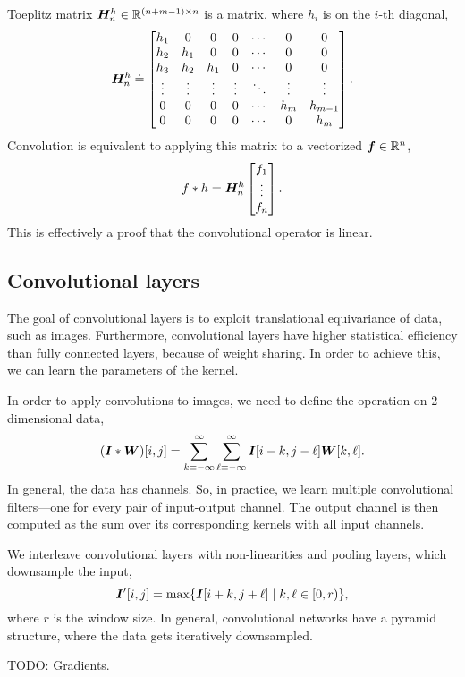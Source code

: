 Toeplitz matrix $\bm{H}_n^h \in \mathbb{R}^{(n + m - 1) \times n}$ is a matrix, where $h_i$ is on the
$i$-th diagonal, \[
    \bm{H}_n^h \doteq \begin{bmatrix}
        h_1    & 0      & 0      & 0      & \cdots & 0      & 0       \\
        h_2    & h_1    & 0      & 0      & \cdots & 0      & 0       \\
        h_3    & h_2    & h_1    & 0      & \cdots & 0      & 0       \\
        \vdots & \vdots & \vdots & \vdots & \ddots & \vdots & \vdots  \\
        0      & 0      & 0      & 0      & \cdots & h_m    & h_{m-1} \\
        0      & 0      & 0      & 0      & \cdots & 0      & h_m
    \end{bmatrix}.
\]
Convolution is equivalent to applying this matrix to a vectorized $\bm{f} \in \mathbb{R}^n$, \[
    f * h = \bm{H}_n^h \begin{bmatrix} f_1 \\ \vdots \\ f_n \end{bmatrix}.
\]
This is effectively a proof that the convolutional operator is linear.

\subsection{Convolutional layers}

The goal of convolutional layers is to exploit translational equivariance of data, such as images.
Furthermore, convolutional layers have higher statistical efficiency than fully connected layers,
because of weight sharing. In order to achieve this, we can learn the parameters of the kernel.

In order to apply convolutions to images, we need to define the operation on 2-dimensional data, \[
    (\bm{I} * \bm{W})[i,j] = \sum_{k=-\infty}^{\infty} \sum_{\ell=-\infty}^{\infty} \bm{I}[i-k,j-\ell] \bm{W}[k,\ell].
\]
In general, the data has channels. So, in practice, we learn multiple convolutional filters---one
for every pair of input-output channel. The output channel is then computed as the sum over its
corresponding kernels with all input channels.

We interleave convolutional layers with non-linearities and pooling layers, which downsample the
input, \[
    \bm{I}'[i,j] = \max \{ \bm{I}[i+k,j+\ell] \mid k, \ell \in [0, r) \},
\]
where $r$ is the window size. In general, convolutional networks have a pyramid structure, where
the data gets iteratively downsampled.

TODO: Gradients.

%
